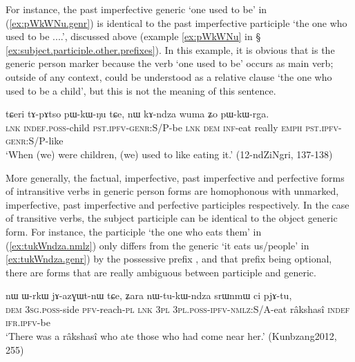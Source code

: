 For instance, the past imperfective generic  `one used to be' in (\ref{ex:pWkWNu.genr}) is identical to the past imperfective participle  `the one who used to be ....', discussed above (example \ref{ex:pWkWNu} in § \ref{ex:subject.participle.other.prefixes}). In this example, it is obvious that  is the generic person marker because the verb  `one used to be' occurs as main verb; outside of any context,   could be understood as a relative clause `the one who used to be a child', but this is not the meaning of this sentence. 

\begin{exe}
\ex \label{ex:pWkWNu.genr}
 \gll tɕeri tɤ-pɤtso pɯ-kɯ-ŋu tɕe, nɯ kɤ-ndza wuma ʑo pɯ-kɯ-rga. \\
 \textsc{lnk} \textsc{indef}.\textsc{poss}-child \textsc{pst}.\textsc{ipfv}-\textsc{genr}:S/P-be \textsc{lnk} \textsc{dem} \textsc{inf}-eat really \textsc{emph} \textsc{pst}.\textsc{ipfv}-\textsc{genr}:S/P-like \\
 \glt `When (we) were children, (we) used to like eating it.' (12-ndZiNgri, 137-138)
\end{exe}

More generally, the factual, imperfective, past imperfective and perfective forms of intransitive verbs in generic person forms are homophonous with unmarked, imperfective, past imperfective and perfective participles respectively. In the case of transitive verbs, the subject participle can be identical to the object generic form. For instance, the participle  `the one who eats them' in (\ref{ex:tukWndza.nmlz}) only differs from the generic  `it eats us/people' in \ref{ex:tukWndza.genr}) by the possessive prefix , and that prefix being optional, there are forms that are really ambiguous between participle and generic. 

\begin{exe}
\ex \label{ex:tukWndza.nmlz}
 \gll nɯ ɯ-rkɯ jɤ-azɣɯt-nɯ tɕe, ʑara nɯ-tu-kɯ-ndza srɯnmɯ ci pjɤ-tu, \\
 \textsc{dem} \textsc{3sg}.\textsc{poss}-side \textsc{pfv}-reach-\textsc{pl} \textsc{lnk} \textsc{3pl} \textsc{3pl}.\textsc{poss}-\textsc{ipfv}-\textsc{nmlz}:S/A-eat râkshasî \textsc{indef} \textsc{ifr}.\textsc{ipfv}-be \\
\glt `There was a râkshasî who ate those who had come near her.' (Kunbzang2012, 255)
\end{exe}

